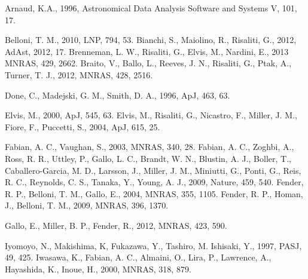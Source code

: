 \documentclass[letters,useAMS,usenatbib]{samnote}
\begin{document}
\begin{thebibliography}{99}

    
    
      Arnaud, K.A., 1996, Astronomical Data Analysis Software and Systems V, 101, 17.

     Belloni, T. M., 2010, LNP, 794, 53.
     Bianchi, S., Maiolino, R., Risaliti, G., 2012, AdAst, 2012, 17.
     Brenneman, L. W., Risaliti, G., Elvis, M., Nardini, E., 2013 MNRAS, 429, 2662.
     Braito, V., Ballo, L., Reeves, J. N., Risaliti, G., Ptak, A., Turner, T. J., 2012, MNRAS, 428, 2516.
    
     Done, C., Madejski, G. M., Smith, D. A., 1996, ApJ, 463, 63.
    
     Elvis, M., 2000, ApJ, 545, 63.
     Elvis, M., Risaliti, G., Nicastro, F., Miller, J. M., Fiore, F., Puccetti, S., 2004, ApJ, 615, 25.
    
     Fabian, A. C., Vaughan, S., 2003, MNRAS, 340, 28.
     Fabian, A. C., Zoghbi, A., Ross, R. R., Uttley, P., Gallo, L. C., Brandt, W. N., Blustin, A. J.,
    Boller, T.,  Caballero-Garcia, M. D., Larsson, J., Miller, J. M., Miniutti, G., Ponti, G., Reis, R. C., Reynolds, C. S., Tanaka, Y., Young, A. J., 2009, Nature, 459,
    540.
     Fender, R. P., Belloni, T. M., Gallo, E., 2004, MNRAS, 355, 1105.
     Fender, R. P., Homan, J., Belloni, T. M., 2009, MNRAS, 396, 1370.
    
     Gallo, E., Miller, B. P., Fender, R., 2012, MNRAS, 423, 590.
    
     Iyomoyo, N., Makishima, K, Fukazawa, Y., Tashiro, M. Ishisaki, Y., 1997, PASJ, 49, 425.
     Iwasawa, K., Fabian, A. C., Almaini, O., Lira, P., Lawrence, A., Hayashida, K., Inoue, H., 2000,
MNRAS, 318, 879.
    

\end{thebibliography}
\end{document}

